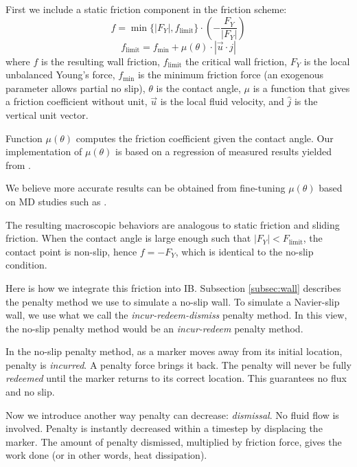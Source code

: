 \documentclass{jfm}
\newcommand{\daniel}[1]{\todo[inline,color=yellow!40]{Daniel: #1}}
\begin{document}
First we include a static friction component in the friction scheme: 
\begin{equation}
    f=\min\{|F_Y|,f_\text{limit}\}
    \cdot
    \left(
    -\frac{F_Y}{|F_Y|}
    \right)
\end{equation}
\begin{equation}
    f_\text{limit}=
    f_{\text{min}}+\mu(\theta)
    \cdot
    |\vec{u}\cdot\hat{j}|
\end{equation}
where $f$ is the resulting wall friction, $f_\text{limit}$ the critical wall friction, $F_Y$ is the local unbalanced Young's force, $f_{\text{min}}$ is the minimum friction force (an exogenous parameter allows partial no slip), $\theta$ is the contact angle, $\mu$ is a function that gives a friction coefficient without unit, $\vec{u}$ is the local fluid velocity, and $\hat{j}$ is the vertical unit vector.

Function $\mu(\theta)$ computes the friction coefficient given the contact angle. Our implementation of $\mu(\theta)$ is based on a regression of measured results yielded from \cite{MD_2018_its_the_bonds}. 
\daniel{psuedo code}

We believe more accurate results can be obtained from fine-tuning $\mu(\theta)$ based on MD studies such as \cite{MD_navier}. 

The resulting macroscopic behaviors are analogous to static friction and sliding friction. When the contact angle is large enough such that $|F_Y|<F_\text{limit}$, the contact point is non-slip, hence $f=-F_Y$, which is identical to the no-slip condition. 

Here is how we integrate this friction into IB. Subsection \ref{subsec:wall} describes the penalty method we use to simulate a no-slip wall. To simulate a Navier-slip wall, we use what we call the \textit{incur-redeem-dismiss} penalty method. In this view, the no-slip penalty method would be an \textit{incur-redeem} penalty method. 

In the no-slip penalty method, as a marker moves away from its initial location, penalty is \textit{incurred}. A penalty force brings it back. The penalty will never be fully \textit{redeemed} until the marker returns to its correct location. This guarantees no flux and no slip. 

Now we introduce another way penalty can decrease: \textit{dismissal}. No fluid flow is involved. Penalty is instantly decreased within a timestep by displacing the marker. The amount of penalty dismissed, multiplied by friction force, gives the work done (or in other words, heat dissipation). 
\daniel{image}
\end{document}
